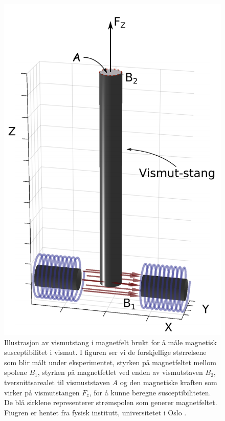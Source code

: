 \documentclass[%
 reprint,
 amsmath,amssymb,
 aps,
 norsk,
]{revtex4-1}
\begin{document}
\begin{figure}[h!]
  \centering
  \includegraphics[scale=0.38]{oppsett1.png}
  \caption{Illustrasjon av vismutstang i magnetfelt brukt for å måle magnetisk susceptibilitet i vismut. I figuren ser vi de forskjellige størrelsene som blir målt under eksperimentet, styrken på magnetfeltet mellom spolene $B_1$, styrken på magnetfetlet ved enden av vismutstaven $B_2$, tversnittsarealet til vismuststaven $A$ og den magnetiske kraften som virker på vismutstangen $F_z$, for å kunne beregne susceptibiliteten. De blå sirklene representerer strømspolen som generer magnetfeltet. Fiugren er hentet fra fysisk institutt, universitetet i Oslo \cite{oppgave}.}
  \label{eksperimentelt_oppsett1}
\end{figure}
\end{document}
